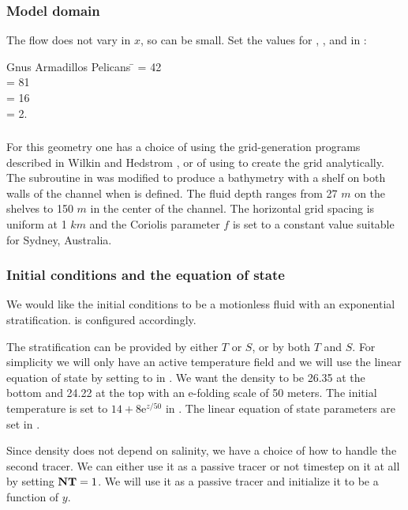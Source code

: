 \subsubsection{Model domain}
The flow does not vary in $x$, so  can be small.
Set the values for , ,  and  in
:
\begin{tabbing}
  Gnus Armadillos Pelicans \= \kill
  \>  = 42 \\
  \>  = 81 \\
  \>  = 16 \\
  \>  = 2.
\end{tabbing}

\subsubsection{}
For this geometry one has a choice of using the grid-generation
programs described in Wilkin and Hedstrom \cite{GRIDS}, or of
using  to create the grid analytically.
The  subroutine in  was
modified to produce a bathymetry with a shelf on both walls of the
channel when  is defined.  The fluid depth ranges from
27 $m$ on the shelves to 150 $m$ in the center of the channel.
The horizontal grid spacing is uniform at 1 $km$ and the
Coriolis parameter $f$ is set to a constant value suitable for
Sydney, Australia.

\subsubsection{Initial conditions and the equation of state}
We would like the initial conditions to be a motionless fluid with an
exponential stratification.   is configured
accordingly.

The stratification can be provided by either $T$ or $S$, or by both
$T$ and $S$.  For
simplicity we will only have an active temperature field and we will
use the linear equation of state by setting  to
 in .  We want the density to be 26.35 at
the bottom and 24.22 at the top with an e-folding scale of 50 meters.
The initial temperature is set to $14 + 8\mbox{e}^{z/50}$ in
.  The linear equation of state parameters are set
in .

Since density does not depend on salinity, we have a choice of how to
handle the second tracer.  We can either use it as a passive tracer or
not timestep on it at all by setting $\mbox{\bf NT}=1$.  We will use
it as a passive tracer and initialize it to be a
function of $y$.

